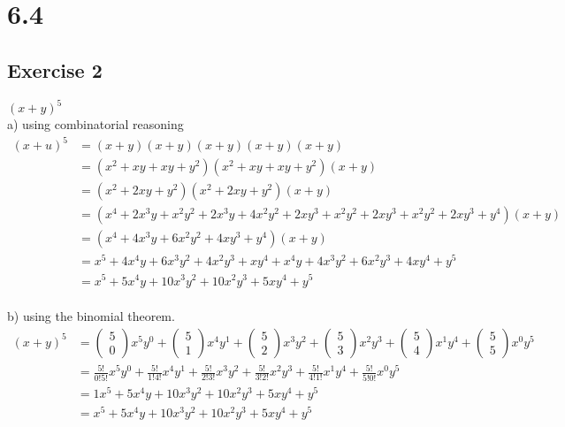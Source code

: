 \documentclass[12pt]{article}
\begin{document}
\section*{6.4}
\subsection*{Exercise 2}
$(x+y)^5$\\
a) using combinatorial reasoning\\
\begin{equation}\nonumber
    \begin{split}
        (x+u)^5&=(x+y)(x+y)(x+y)(x+y)(x+y)\\
        &=(x^2+xy+xy+y^2)(x^2+xy+xy+y^2)(x+y)\\
        &=(x^2+2xy+y^2)(x^2+2xy+y^2)(x+y)\\
        &=(x^4+2x^3y+x^2y^2+2x^3y+4x^2y^2+2xy^3+x^2y^2+2xy^3+x^2y^2+2xy^3+y^4)(x+y)\\
        &=(x^4+4x^3y+6x^2y^2+4xy^3+y^4)(x+y)\\
        &=x^5+4x^4y+6x^3y^2+4x^2y^3+xy^4+x^4y+4x^3y^2+6x^2y^3+4xy^4+y^5\\
        &=x^5+5x^4y+10x^3y^2+10x^2y^3+5xy^4+y^5
    \end{split}
\end{equation}
\\
b) using the binomial theorem.\\
\begin{equation}\nonumber
    \begin{split}
        (x+y)^5&=\left(\substack{5\\0}\right)x^5y^0+\left(\substack{5\\1}\right)x^4y^1+\left(\substack{5\\2}\right)x^3y^2+\left(\substack{5\\3}\right)x^2y^3+\left(\substack{5\\4}\right)x^1y^4+\left(\substack{5\\5}\right)x^0y^5\\
        &=\frac{5!}{0!5!}x^5y^0+\frac{5!}{1!4!}x^4y^1+\frac{5!}{2!3!}x^3y^2+\frac{5!}{3!2!}x^2y^3+\frac{5!}{4!1!}x^1y^4+\frac{5!}{5!0!}x^0y^5\\
        &=1x^5+5x^4y+10x^3y^2+10x^2y^3+5xy^4+y^5\\
        &=x^5+5x^4y+10x^3y^2+10x^2y^3+5xy^4+y^5
    \end{split}
\end{equation}
\\
\end{document}
